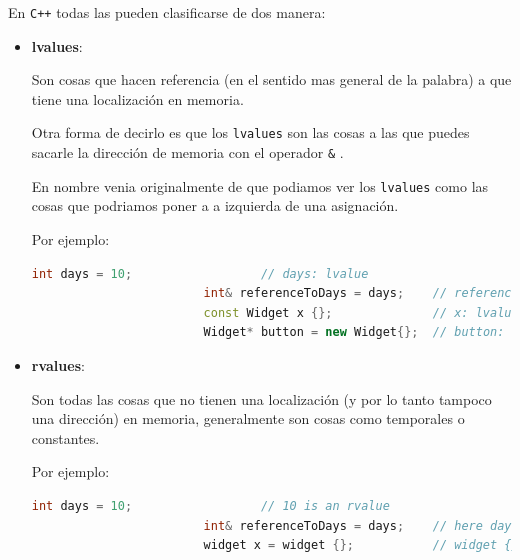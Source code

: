 \documentclass[12pt, fleqn]{report}                             %
\newcommand \Quote              {\qq}                           %
\theoremstyle{break}                                            %
\newcommand{\textCode}[1]  { \texttt{#1} }                      %
\newcommand{\Cpp}{\ignorespaces\textCode{C++}}                  %
\begin{document}
            En \Cpp todas las \Quote{cosas} pueden clasificarse de dos manera:
            \begin{itemize}
                \item \textbf{lvalues}: 
                
                    Son cosas que hacen referencia (en el sentido mas general de la palabra)
                    a \Quote{algo} que tiene una localización en memoria.

                    Otra forma de decirlo es que los \textCode{lvalues} son las cosas a las que 
                    puedes sacarle la dirección de memoria con el operador \textCode{\&}.

                    En nombre venia originalmente de que podiamos ver los \textCode{lvalues} 
                    como las cosas que podriamos poner a a izquierda de una asignación.

                    Por ejemplo:
                    \begin{lstlisting}[language=C++, gobble=24]
                        int days = 10;                  // days: lvalue
                        int& referenceToDays = days;    // referenceToDays: lvalue
                        const Widget x {};              // x: lvalue
                        Widget* button = new Widget{};  // button: lvalue
                    \end{lstlisting}

                \item \textbf{rvalues}:
                
                    Son todas las cosas que no tienen una localización (y por lo tanto tampoco una
                    dirección) en memoria, generalmente son cosas como temporales o constantes.

                    Por ejemplo:
                    \begin{lstlisting}[language=C++, gobble=24]
                        int days = 10;                  // 10 is an rvalue
                        int& referenceToDays = days;    // here days is an rvalue
                        widget x = widget {};           // widget {} is an rvalue
                    \end{lstlisting}

                    \cite{CppFromBeginningToIntermidiate}

            \end{itemize}

                
        \clearpage
\end{document}
